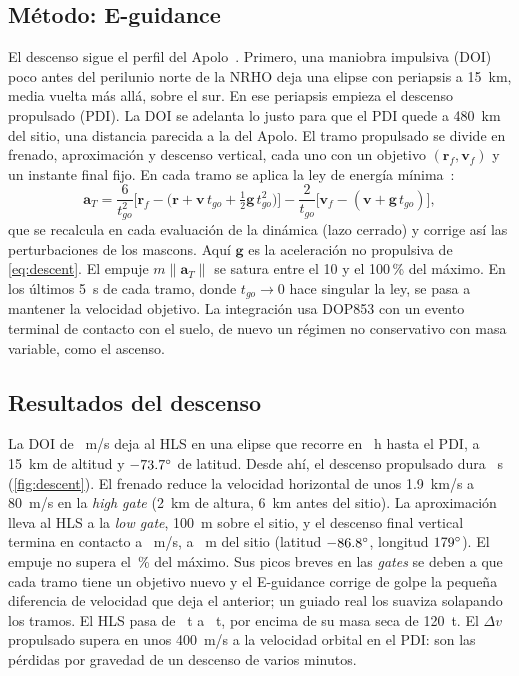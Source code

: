 \documentclass[11pt,a4paper]{article}
\newcommand{\vect}[1]{\mathbf{#1}}
\begin{document}
\subsection{Método: E-guidance}
El descenso sigue el perfil del Apolo~\cite{klumpp1974}. Primero, una maniobra impulsiva (DOI) poco antes del perilunio norte de la NRHO deja una elipse con periapsis a \SI{15}{km}, media vuelta más allá, sobre el sur. En ese periapsis empieza el descenso propulsado (PDI). La DOI se adelanta lo justo para que el PDI quede a \SI{480}{km} del sitio, una distancia parecida a la del Apolo. El tramo propulsado se divide en frenado, aproximación y descenso vertical, cada uno con un objetivo $(\vect r_f,\vect v_f)$ y un instante final fijo. En cada tramo se aplica la ley de energía mínima~\cite{dsouza1997}:
\begin{equation}
\vect a_T=\frac{6}{t_{go}^2}\Big[\vect r_f-\big(\vect r+\vect v\,t_{go}+\tfrac12\vect g\,t_{go}^2\big)\Big]-\frac{2}{t_{go}}\Big[\vect v_f-(\vect v+\vect g\,t_{go})\Big],
\end{equation}
que se recalcula en cada evaluación de la dinámica (lazo cerrado) y corrige así las perturbaciones de los mascons. Aquí $\vect g$ es la aceleración no propulsiva de \eqref{eq:descent}. El empuje $m\|\vect a_T\|$ se satura entre el 10 y el 100\,\% del máximo. En los últimos \SI{5}{s} de cada tramo, donde $t_{go}\to0$ hace singular la ley, se pasa a mantener la velocidad objetivo. La integración usa DOP853 con un evento terminal de contacto con el suelo, de nuevo un régimen no conservativo con masa variable, como el ascenso.
\subsection{Resultados del descenso}
La DOI de \RMDvDoiMs~m/s deja al HLS en una elipse que recorre en \RMCoastH~h hasta el PDI, a \SI{15}{km} de altitud y $-73.7^\circ$ de latitud. Desde ahí, el descenso propulsado dura \RMPoweredS~s (\autoref{fig:descent}). El frenado reduce la velocidad horizontal de unos \SI{1.9}{km/s} a \SI{80}{m/s} en la \emph{high gate} (\SI{2}{km} de altura, \SI{6}{km} antes del sitio). La aproximación lleva al HLS a la \emph{low gate}, \SI{100}{m} sobre el sitio, y el descenso final vertical termina en contacto a \RMTouchdownSpeedMs~m/s, a \RMLandingErrorM~m del sitio (latitud $-86.8^\circ$, longitud $179^\circ$). El empuje no supera el \RMMaxThrottlePct\,\% del máximo. Sus picos breves en las \emph{gates} se deben a que cada tramo tiene un objetivo nuevo y el E-guidance corrige de golpe la pequeña diferencia de velocidad que deja el anterior; un guiado real los suaviza solapando los tramos. El HLS pasa de \RMHlsMassInitialT~t a \RMHlsMassLandedT~t, por encima de su masa seca de \SI{120}{t}. El $\Delta v$ propulsado supera en unos \SI{400}{m/s} a la velocidad orbital en el PDI: son las pérdidas por gravedad de un descenso de varios minutos.
\end{document}
